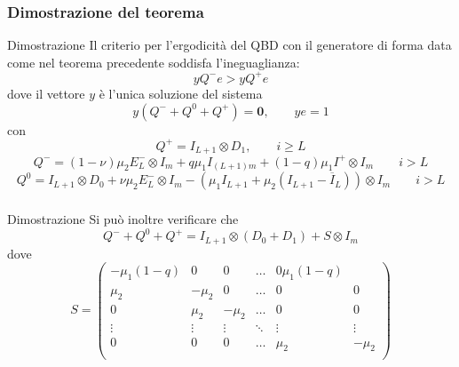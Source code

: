 \documentclass{beamer}
\begin{document}
\begin{frame}
    \frametitle{Dimostrazione del teorema}
    \begin{block}{Dimostrazione}
        Il criterio per l'ergodicità del QBD con il generatore di forma data come nel teorema precedente soddisfa l'ineguaglianza:
        \begin{equation*}
            y Q^- e > y Q^+e
        \end{equation*}
        dove il vettore $y$ è l'unica soluzione del sistema
        \begin{equation*}
            y(Q^- + Q^0 + Q^+) = \textbf{0}, \qquad ye = 1
        \end{equation*}
        con
        \small{\begin{equation*}
            Q^+ = I_{L+1} \otimes D_1, \qquad i \geq L
        \end{equation*}
        \begin{equation*}
            Q^- = (1-\nu) \mu_2 E_L^- \otimes I_m + q \mu_1 I_{(L+1)m} + (1-q)\mu_1I^+ \otimes I_m \qquad i > L
        \end{equation*}
        \begin{equation*}
            Q^0 = I_{L+1} \otimes D_0 + \nu \mu_2 E_L^{-} \otimes I_m - (\mu_1 I_{L+1} + \mu_2(I_{L+1} - \overline{I}_L)) \otimes I_m \qquad i > L
        \end{equation*}}

    \end{block}
\end{frame}


\begin{frame}
    \frametitle{}
    \begin{block}{Dimostrazione}
        Si può inoltre verificare che
        \begin{equation*}\label{eq:bigotimes}
            Q^- + Q^0 + Q^+ = I_{L+1} \otimes (D_0 + D_1) + S \otimes I_{m}
        \end{equation*}
        dove
        \begin{equation*}
            S =
            \begin{pmatrix}
                -\mu_1 (1-q) & 0 & 0 & \dots & 0 \mu_1(1-q) \\
                \mu_2 & -\mu_2 & 0 & \dots & 0 & 0 \\
                0 & \mu_2 & -\mu_2 & \dots & 0 & 0 \\
                \vdots & \vdots & \vdots & \ddots & \vdots & \vdots \\
                0 & 0 & 0 & \dots & \mu_2 & -\mu_2 \\
            \end{pmatrix}
        \end{equation*}
    \end{block}
\end{frame}
\end{document}
